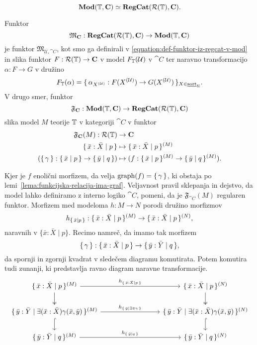 \documentclass[../kategoricna_logika.tex]{subfiles}
\begin{document}
$$\mathbf{Mod}(\mathbb{T}, {\operatorname{\mathbf{C}}}) \simeq {\operatorname{\mathbf{RegCat}}}(\mathcal{R}(\mathbb{T}), {\operatorname{\mathbf{C}}}).$$
\begin{definicija}\label{def:ekvivalenca-reg-logike-reg-kategorij}
  Funktor
$$\mathfrak{M}_{{\operatorname{\mathbf{C}}}} : {\operatorname{\mathbf{RegCat}}}(\mathcal{R}(\mathbb{T}), {\operatorname{\mathbf{C}}}) \to \mathbf{Mod}(\mathbb{T}, {\operatorname{\mathbf{C}}})$$
je funktor $\mathfrak{M}_{\mathcal{U}, \cat{C}}$, kot smo ga definirali
v \eqref{equation:def-funktor-iz-regcat-v-mod} in slika funktor
$F : \mathcal{R}(\mathbb{T}) \to {\operatorname{\mathbf{C}}}$ v model $F_{\mathbb{T}}(\mathcal{U})$ v
$\cat{C}$ ter naravno transformacijo $\alpha : F \to G$ v družino
$$F_{\mathbb{T}}(\alpha) = \lbrace\,\alpha_{{X}^{(\mathcal{U})}} : F({X}^{(\mathcal{U})}) \to G({X}^{(\mathcal{U})})\,\rbrace_{X \in \underline{\mathrm{sort}}_{\Sigma}}.$$
V drugo smer, funktor
$$\mathfrak{F}_{{\operatorname{\mathbf{C}}}} : \mathbf{Mod}(\mathbb{T}, {\operatorname{\mathbf{C}}}) \to {\operatorname{\mathbf{RegCat}}}(\mathcal{R}(\mathbb{T}), {\operatorname{\mathbf{C}}})$$
slika model $M$ teorije $\mathbb{T}$ v kategoriji $\cat{C}$ v funktor
\begin{align*}
  \mathfrak{F}_{{\operatorname{\mathbf{C}}}}(M) : \mathcal{R}(\mathbb{T}) &\to {\operatorname{\mathbf{C}}}\\
  \lbrace\,\bar{x}:\bar{X} \mid  p\,\rbrace &\mapsto \lbrace\,\bar{x}:\bar{X} \mid  p\,\rbrace^{(M)} \\
  (\lbrace\,\gamma\,\rbrace : \lbrace\,\bar{x} \mid  p\,\rbrace \to \lbrace\,\bar{y} \mid  q\,\rbrace)
                                              &\mapsto (f : \lbrace\,\bar{x} \mid  p\,\rbrace^{(M)} \to \lbrace\,\bar{y} \mid  q\,\rbrace^{(M)}).
\end{align*}
\end{definicija}
Kjer je $f$ enolični morfizem, da velja $\mathrm{graph}(f) = \lbrace\,\gamma\,\rbrace$, ki
obstaja po lemi~\ref{lema:funkcijska-relacija-ima-graf}.
Veljavnost pravil sklepanja in dejstvo, da model lahko definiramo z
interno logiko $\cat{C}$, pomeni, da je $\mathfrak{F}_{\cat{C}}(M)$
regularen funktor.  Morfizem med modeloma $h : M \to N$ porodi družino
morfizmov
$$h_{\lbrace\,\bar{x}\mid  p\,\rbrace} : \lbrace\,\bar{x}:\bar{X} \mid  p\,\rbrace^{(M)} \to \lbrace\,\bar{x}:\bar{X} \mid  p\,\rbrace^{(N)},$$
naravnih v $\{\bar{x}:\bar{X} \mid p\}$. Recimo namreč, da imamo tak morfizem
$$\lbrace\,\gamma\,\rbrace : \lbrace\,\bar{x}:\bar{X} \mid  p\,\rbrace \to \lbrace\,\bar{y}:\bar{Y} \mid  q\,\rbrace,$$
da spornji in zgornji kvadrat v sledečem diagramu komutirata.
Potem komutira tudi zunanji, ki predstavlja ravno diagram naravne transformacije.
\begin{equation*}
  \begin{tikzcd}[column sep=3cm]
    {\set{\bar{x}:\bar{X} \mid  p}^{(M)}} \ar[d, two heads] \ar[r, "{h_{\set{\bar{x}:\bar{X} \mid  p}}}"] &
    {\set{\bar{x}:\bar{X} \mid  p}^{(N)}} \ar[d, two heads] \\
    \set{\bar{y}:\bar{Y} \mid  \exists (\bar{x}:\bar{X}) \gamma(\bar{x}, \bar{y})}^{(M)}
    \ar[d, hook] \ar[r, "{h_{\set{\bar{y} \mid  \exists \bar{x} \gamma}}}"] &
    \set{\bar{y}:\bar{Y} \mid  \exists (\bar{x}:\bar{X}) \gamma(\bar{x}, \bar{y})}^{(N)} \ar[d, hook] \\
    \set{\bar{y}:\bar{Y} \mid  q}^{(M)} \ar[r,
    "{h_{\set{\bar{y} \mid  q}}}"] & \set{\bar{y}:\bar{Y} \mid  q}^{(N)}
  \end{tikzcd}
\end{equation*}
\end{document}
